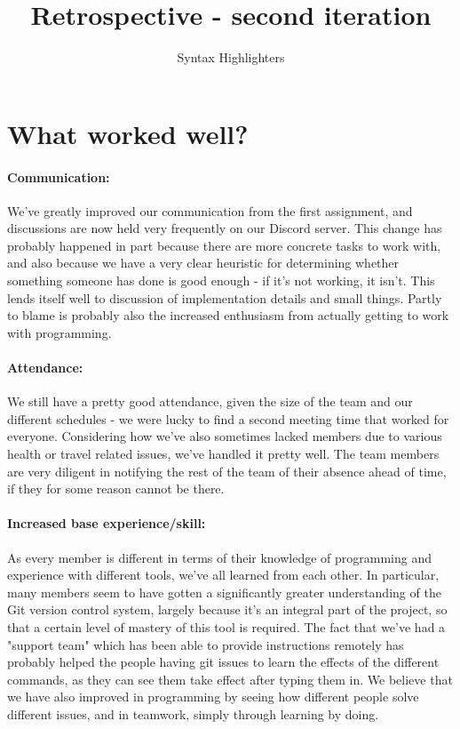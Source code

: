 \documentclass{article}
\title{Retrospective - second iteration}
\author{Syntax Highlighters}
\begin{document}
\maketitle

\section*{What worked well?}

\paragraph{Communication:} We've greatly improved our communication from the first assignment, and discussions are now held very frequently on our Discord server. This change has probably happened in part because there are more concrete tasks to work with, and also because we have a very clear heuristic for determining whether something someone has done is good enough - if it's not working, it isn't. This lends itself well to discussion of implementation details and small things. Partly to blame is probably also the increased enthusiasm from actually getting to work with programming.

\paragraph{Attendance:} We still have a pretty good attendance, given the size of the team and our different schedules - we were lucky to find a second meeting time that worked for everyone. Considering how we've also sometimes lacked members due to various health or travel related issues, we've handled it pretty well. The team members are very diligent in notifying the rest of the team of their absence ahead of time, if they for some reason cannot be there.

\paragraph{Increased base experience/skill:} As every member is different in terms of their knowledge of programming and experience with different tools, we've all learned from each other. In particular, many members seem to have gotten a significantly greater understanding of the Git version control system, largely because it's an integral part of the project, so that a certain level of mastery of this tool is required. The fact that we've had a "support team" which has been able to provide instructions remotely has probably helped the people having git issues to learn the effects of the different commands, as they can see them take effect after typing them in. We believe that we have also improved in programming by seeing how different people solve different issues, and in teamwork, simply through learning by doing.
\end{document}
